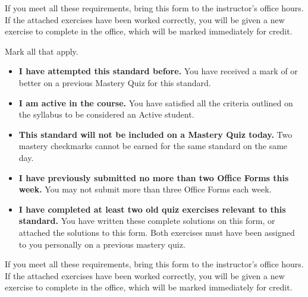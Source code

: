 \documentclass[12pt]{article}
\newcommand{\issuesMark}{{\fontencoding{U}\fontfamily{futs}\selectfont\char 66\relax}}
\begin{document}
If you meet all these requirements,
bring this form to the instructor's office hours. 
If the attached exercises have been worked correctly, you will be given
a new exercise to complete in the office, which will be marked immediately for credit.
\newpage



\vspace{1em}



\renewcommand\labelitemi{\(\square\)}
Mark all that apply.
\begin{itemize}
  \item \textbf{I have attempted this standard before.}
        You have received a mark of \issuesMark{} or better on a previous Mastery Quiz
        for this standard.
  \item \textbf{I am active in the course.}
        You have satisfied all the criteria outlined on the syllabus to be
        considered an Active student.
  \item \textbf{This standard will not be included on a Mastery Quiz today.}
        Two mastery checkmarks cannot be earned for the same standard on the same day.
  \item \textbf{I have previously submitted no more than two Office Forms this week.}
        You may not submit more than three Office Forms each week.
  \item \textbf{I have completed at least two old quiz exercises
        relevant to this standard.}
        You have written these complete solutions on this form, or attached the solutions
        to this form. Both exercises must have been assigned to you personally
        on a previous mastery quiz.
\end{itemize}

If you meet all these requirements,
bring this form to the instructor's office hours. 
If the attached exercises have been worked correctly, you will be given
a new exercise to complete in the office, which will be marked immediately for credit.
\end{document}
